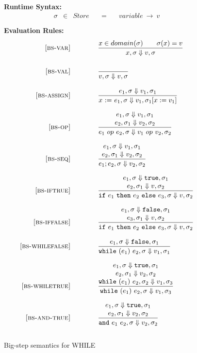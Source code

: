 \documentclass{article}
\begin{document}
\begin{figure}[H]\label{fig:bigstep}
\caption{Big-step semantics for WHILE}
{\bf Runtime Syntax:}
\[
\begin{array}{rclcl}
  \sigma & \in & {Store} \quad  & = & \quad {variable} ~\rightarrow ~v \\
  \\
\end{array}
\]
{\bf Evaluation Rules:~~~ } \\
\[
\begin{array}{r@{\qquad\qquad}l}

\bsrule{bs-var}{
  x \in domain(\sigma) \qquad \sigma(x)=v
}{
  \bstep{x}{\sigma}{v}{\sigma}
}

\bsrule{bs-val}{
}{
  \bstep{v}{\sigma}{v}{\sigma}
}

\bsrule{bs-assign}{
  \bstep{e_1}{\sigma}{v_1}{\sigma_1}
}{
  \bstep{\assign{x}{e_1}}{\sigma}{v_1}{\sigma_1[x:=v_1]}
}

\bsrule{bs-op}{
  \bstep{e_1}{\sigma}{v_1}{\sigma_1} \\
  \bstep{e_2}{\sigma_1}{v_2}{\sigma_2}
}{
  \bstep{e_1~op~e_2}{\sigma}{v_1 ~op~ v_2}{\sigma_2}
}

\bsrule{bs-seq}{
  \bstep{e_1}{\sigma}{v_1}{\sigma_1} \\
  \bstep{e_2}{\sigma_1}{v_2}{\sigma_2}
}{
  \bstep{e_1;e_2}{\sigma}{v_2}{\sigma_2}
}

\bsrule{bs-iftrue}{
  \bstep{e_1}{\sigma}{\true}{\sigma_1} \\
  \bstep{e_2}{\sigma_1}{v}{\sigma_2}
}{
  \bstep{\ife{e_1}{e_2}{e_3}}{\sigma}{v}{\sigma_2}
}

\bsrule{bs-iffalse}{
  \bstep{e_1}{\sigma}{\false}{\sigma_1} \\
  \bstep{e_3}{\sigma_1}{v}{\sigma_2}
}{
  \bstep{\ife{e_1}{e_2}{e_3}}{\sigma}{v}{\sigma_2}
}

\bsrule{bs-whilefalse}{
  \bstep{e_1}{\sigma}{\false}{\sigma_1}
}{
  \bstep{\whilee{e_1}{e_2}}{\sigma}{v_1}{\sigma_1}
}

\bsrule{bs-whiletrue}{
  \bstep{e_1}{\sigma}{\true}{\sigma_1} \\
  \bstep{e_2}{\sigma_1}{v_2}{\sigma_2} \\
  \bstep{\whilee{e_1}{e_2}}{\sigma_2}{v_1}{\sigma_3} 
}{
  \bstep{\whilee{e_1}{e_2}}{\sigma}{v_1}{\sigma_3}
}

\bsrule{bs-and-true}{
  \bstep{e_1}{\sigma}{\true}{\sigma_1} \\
  \bstep{e_2}{\sigma_1}{v_2}{\sigma_2}
}{
  \bstep{\andE{e_1}{e_2}}{\sigma}{v_2}{\sigma_2}
}


\end{array}\]
\end{figure}
\end{document}
